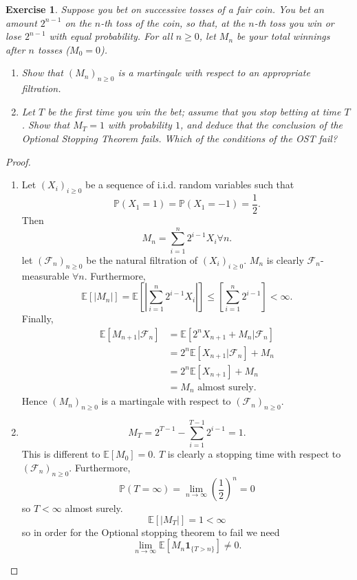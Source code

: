 \documentclass{article}
\newtheorem{exercise}[theorem]{Exercise}
\begin{document}
\begin{exercise}
Suppose you bet on successive tosses of a fair coin. You bet an amount $2^{n-1}$ on the $n$-th toss of the coin, so that, at the $n$-th toss you win or lose $2^{n-1}$ with equal probability. For all $n \geq 0$, let $M_n$ be your total winnings after $n$ tosses ($M_0 = 0$).

\begin{enumerate}
    \item[(i)] Show that $(M_n)_{n \geq 0}$ is a martingale with respect to an appropriate filtration.
    
    \item[(ii)] Let $T$ be the first time you win the bet; assume that you stop betting at time $T$. Show that $M_T = 1$ with probability $1$, and deduce that the conclusion of the Optional Stopping Theorem fails. Which of the conditions of the OST fail?
\end{enumerate}
\end{exercise}
\begin{proof}
\begin{enumerate}
\item[(i)] Let $(X_i)_{i\geq0}$ be a sequence of i.i.d. random variables such that \[\mathbb{P}(X_1=1)=\mathbb{P}(X_1=-1)=\frac{1}{2}.\]Then \[M_n=\sum_{i=1}^n2^{i-1}X_i\forall n.\] let $(\mathcal{F}_n)_{n\geq0}$ be the natural filtration of $(X_i)_{i\geq0}$.
$M_n$ is clearly $\mathcal{F}_n$-measurable $\forall n$. Furthermore,\[\mathbb{E}[|M_n|]=\mathbb{E}\left[\left|\sum_{i=1}^n2^{i-1}X_i\right|\right]\leq\left[\sum_{i=1}^n2^{i-1}\right]<\infty.\]
Finally,\begin{align*}\mathbb{E}[M_{n+1}|\mathcal{F}_n]&=\mathbb{E}[2^nX_{n+1}+M_n|\mathcal{F}_n]\\&=2^n\mathbb{E}[X_{n+1}|\mathcal{F}_n]+M_n\\&=2^n\mathbb{E}[X_{n+1}]+M_n\\&=M_n\text{ almost surely.}\end{align*} Hence $(M_n)_{n\geq0}$ is a martingale with respect to $(\mathcal{F}_n)_{n\geq0}$.
\item[(ii)] \[M_T=2^{T-1}-\sum_{i=1}^{T-1}2^{i-1}=1.\] This is different to $\mathbb{E}[M_0]=0$. $T$ is clearly a stopping time with respect to $(\mathcal{F}_n)_{n\geq0}$. Furthermore, \[\mathbb{P}(T=\infty)=\lim_{n\to\infty}\left(\frac{1}{2}\right)^n=0\] so $T<\infty$ almost surely.\[\mathbb{E}[|M_T|]=1<\infty\] so in order for the Optional stopping theorem to fail we need\[\lim_{n\to\infty}\mathbb{E}[M_n\mathbf{1}_{\{T>n\}}]\neq0.\]
\end{enumerate}
\end{proof}
\end{document}
